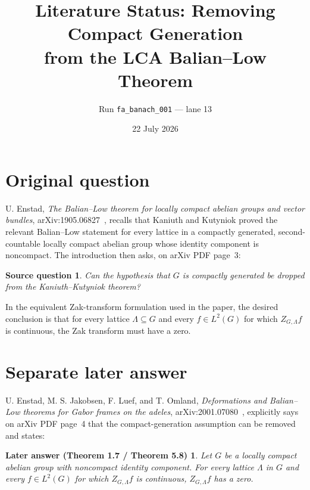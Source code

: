 \documentclass[11pt]{article}
\title{Literature Status: Removing Compact Generation\\
from the LCA Balian--Low Theorem}
\author{Run \texttt{fa\_banach\_001} --- lane 13}
\date{22 July 2026}
\newtheorem*{question}{Source question}
\newtheorem*{answer}{Later answer (Theorem 1.7 / Theorem 5.8)}
\begin{document}
\maketitle

\begin{center}
\end{center}

\section*{Original question}

U. Enstad, \emph{The Balian--Low theorem for locally compact abelian groups
and vector bundles}, arXiv:1905.06827~\cite{source}, recalls that Kaniuth and
Kutyniok proved the relevant Balian--Low statement for every lattice in a
compactly generated, second-countable locally compact abelian group whose
identity component is noncompact.  The introduction then asks, on arXiv PDF
page~3:

\begin{question}
Can the hypothesis that $G$ is compactly generated be dropped from the
Kaniuth--Kutyniok theorem?
\end{question}

In the equivalent Zak-transform formulation used in the paper, the desired
conclusion is that for every lattice $\Lambda\subseteq G$ and every
$f\in L^2(G)$ for which $Z_{G,\Lambda}f$ is continuous, the Zak transform
must have a zero.

\section*{Separate later answer}

U. Enstad, M. S. Jakobsen, F. Luef, and T. Omland,
\emph{Deformations and Balian--Low theorems for Gabor frames on the adeles},
arXiv:2001.07080~\cite{answerpaper}, explicitly says on arXiv PDF page~4
that the compact-generation assumption can be removed and states:

\begin{answer}
Let $G$ be a locally compact abelian group with noncompact identity
component.  For every lattice $\Lambda$ in $G$ and every $f\in L^2(G)$
for which $Z_{G,\Lambda}f$ is continuous, $Z_{G,\Lambda}f$ has a zero.
\end{answer}
\end{document}
